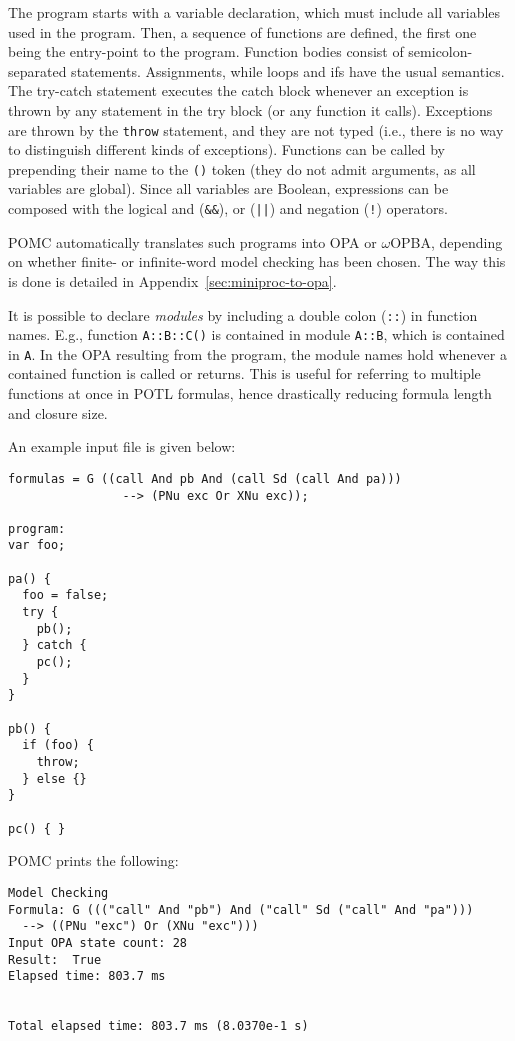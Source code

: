 \documentclass[9pt,a4paper]{article}
\begin{document}
The program starts with a variable declaration, which must include all variables used in the program.
Then, a sequence of functions are defined, the first one being the entry-point to the program.
Function bodies consist of semicolon-separated statements.
Assignments, while loops and ifs have the usual semantics.
The try-catch statement executes the catch block whenever an exception is thrown by any statement
in the try block (or any function it calls).
Exceptions are thrown by the \texttt{throw} statement, and they are not typed
(i.e., there is no way to distinguish different kinds of exceptions).
Functions can be called by prepending their name to the \texttt{()} token
(they do not admit arguments, as all variables are global).
Since all variables are Boolean, expressions can be composed with the logical and (\texttt{\&\&}),
or (\texttt{||}) and negation (\texttt{!}) operators.

POMC automatically translates such programs into OPA or $\omega$OPBA,
depending on whether finite- or infinite-word model checking has been chosen.
The way this is done is detailed in Appendix~\ref{sec:miniproc-to-opa}.

It is possible to declare \emph{modules} by including a double colon (\texttt{::})
in function names. E.g., function \texttt{A::B::C()} is contained in module \texttt{A::B},
which is contained in \texttt{A}. In the OPA resulting from the program, the module
names hold whenever a contained function is called or returns.
This is useful for referring to multiple functions at once in POTL formulas, hence drastically
reducing formula length and closure size.

An example input file is given below:
\begin{verbatim}
formulas = G ((call And pb And (call Sd (call And pa)))
                --> (PNu exc Or XNu exc));

program:
var foo;

pa() {
  foo = false;
  try {
    pb();
  } catch {
    pc();
  }
}

pb() {
  if (foo) {
    throw;
  } else {}
}

pc() { }
\end{verbatim}

POMC prints the following:
\begin{verbatim}
Model Checking
Formula: G ((("call" And "pb") And ("call" Sd ("call" And "pa")))
  --> ((PNu "exc") Or (XNu "exc")))
Input OPA state count: 28
Result:  True
Elapsed time: 803.7 ms


Total elapsed time: 803.7 ms (8.0370e-1 s)
\end{verbatim}
\end{document}
